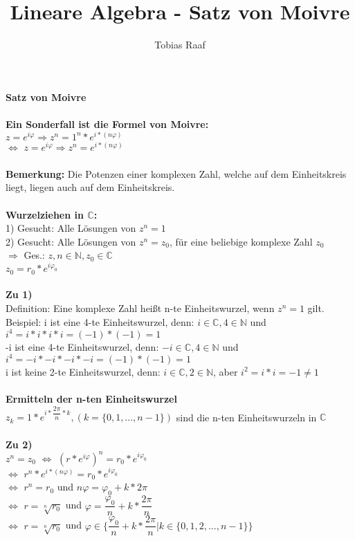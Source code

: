 \documentclass{scrartcl}
\title{Lineare Algebra - Satz von Moivre}
\author{Tobias Raaf}
\begin{document}
\Large \textbf{Satz von Moivre}\\\\
\normalsize
\textbf{Ein Sonderfall ist die Formel von Moivre:}\\
$z=e^{i\varphi}\Rightarrow z^n=1^n*e^{i*(n\varphi)}$\\
$\Leftrightarrow$ $z=e^{i\varphi}\Rightarrow z^n=e^{i*(n\varphi)}$\\\\
\textbf{Bemerkung:} Die Potenzen einer komplexen Zahl, welche auf dem Einheitskreis liegt, liegen auch auf dem Einheitskreis.\\\\
\textbf{Wurzelziehen in $\mathbb{C}$:}\\
1) Gesucht: Alle Lösungen von $z^n=1$\\
2) Gesucht: Alle Lösungen von $z^n=z_0$, für eine beliebige komplexe Zahl $z_0$\\
$\Rightarrow$ Ges.: $z,n\in\mathbb{N},z_0\in\mathbb{C}$\\
$z_0=r_0*e^{i\varphi_0}$\\\\
\textbf{Zu 1)}\\
Definition: Eine komplexe Zahl heißt n-te Einheitswurzel, wenn $z^n=1$ gilt.\\
Beispiel: i ist eine 4-te Einheitswurzel, denn: $i\in\mathbb{C},4\in\mathbb{N}$ und $i^4=i*i*i*i=(-1)*(-1)=1$\\
-i ist eine 4-te Einheitswurzel, denn: $-i\in\mathbb{C},4\in\mathbb{N}$ und $i^4=-i*-i*-i*-i=(-1)*(-1)=1$\\
i ist keine 2-te Einheitswurzel, denn: $i\in\mathbb{C},2\in\mathbb{N}$, aber $i^2=i*i=-1\neq1$\\
\\
\textbf{Ermitteln der n-ten Einheitswurzel}\\
$z_k=1*e^{i*\dfrac{2\pi}{n}*k},(k=\{0,1,...,n-1\})$ sind die n-ten Einheitswurzeln in $\mathbb{C}$\\\\
\textbf{Zu 2)}\\
$z^n=z_0$ $\Leftrightarrow$ $(r*e^{i\varphi})^n=r_0*e^{i\varphi_0}$\\
$\Leftrightarrow$ $r^n*e^{i*(n\varphi)}=r_0*e^{i\varphi_0}$\\
$\Leftrightarrow$ $r^n=r_0$ und $n\varphi=\varphi_0+k*2\pi$\\
$\Leftrightarrow$ $r=\sqrt[n]{r_0}$ und $\varphi=\dfrac{\varphi_0}{n}+k*\dfrac{2\pi}{n}$\\
$\Leftrightarrow$ $r=\sqrt[n]{r_0}$ und $\varphi\in\{\dfrac{\varphi_0}{n}+k*\dfrac{2\pi}{n}|k\in\{0,1,2,...,n-1\}\}$\\
\end{document}
